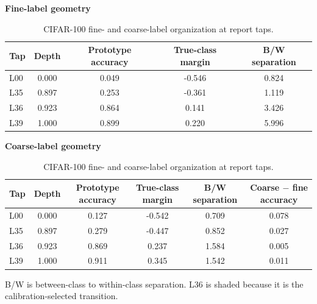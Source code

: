 \begin{table}[!htbp]
\centering
\begin{threeparttable}
\caption{CIFAR-100 fine- and coarse-label organization at report taps.}
\label{tab:pca-cifar100-hierarchy-main}
\footnotesize
\setlength{\tabcolsep}{4pt}
\renewcommand{\arraystretch}{1.06}
\textbf{Fine-label geometry}\par\vspace{2pt}
\begin{tabularx}{\linewidth}{@{}l c c c c@{}}
\toprule
Tap & Depth & Prototype accuracy & True-class margin & B/W separation\\
\midrule
L00 & 0.000 & 0.049 & -0.546 & 0.824\\
\thinrowrule
L35 & 0.897 & 0.253 & -0.361 & 1.119\\
\thinrowrule
\rowcolor{transitionrow} L36 & 0.923 & 0.864 & 0.141 & 3.426\\
\thinrowrule
L39 & 1.000 & 0.899 & 0.220 & 5.996\\
\bottomrule
\end{tabularx}

\vspace{5pt}
\textbf{Coarse-label geometry}\par\vspace{2pt}
\begin{tabularx}{\linewidth}{@{}l c c c c c@{}}
\toprule
Tap & Depth & Prototype accuracy & True-class margin & B/W separation & Coarse $-$ fine accuracy\\
\midrule
L00 & 0.000 & 0.127 & -0.542 & 0.709 & 0.078\\
\thinrowrule
L35 & 0.897 & 0.279 & -0.447 & 0.852 & 0.027\\
\thinrowrule
\rowcolor{transitionrow} L36 & 0.923 & 0.869 & 0.237 & 1.584 & 0.005\\
\thinrowrule
L39 & 1.000 & 0.911 & 0.345 & 1.542 & 0.011\\
\bottomrule
\end{tabularx}
\begin{tablenotes}[flushleft]\footnotesize
\item B/W is between-class to within-class separation. L36 is shaded because it is the calibration-selected transition.
\end{tablenotes}
\end{threeparttable}
\end{table}
